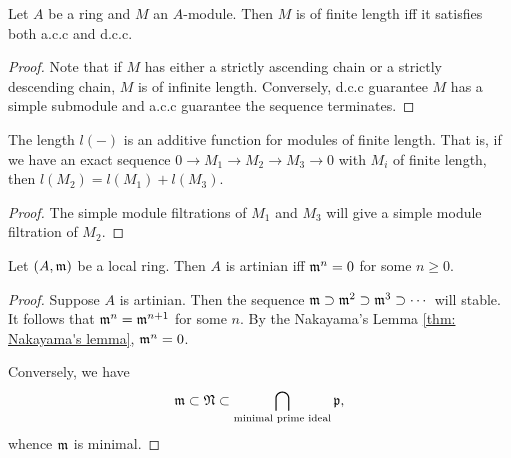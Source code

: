     \begin{proposition}\label{prop: of finite length iff both acc and dcc}
        Let $A$ be a ring and $M$ an $A$-module.
        Then $M$ is of finite length iff it satisfies both a.c.c and d.c.c.
    \end{proposition}
    \begin{proof}
        Note that if $M$ has either a strictly ascending chain or a strictly descending chain, $M$ is of infinite length.
        Conversely, d.c.c guarantee $M$ has a simple submodule and a.c.c guarantee the sequence terminates.
    \end{proof}

    \begin{proposition}\label{prop: length is additive for modules of finite length}
        The length $l(-)$ is an additive function for modules of finite length.
        That is, if we have an exact sequence $0 \to M_1 \to M_2 \to M_3 \to 0$ with $M_i$ of finite length, then $l(M_2) = l(M_1) + l(M_3)$.
    \end{proposition}
    \begin{proof}
        The simple module filtrations of $M_1$ and $M_3$ will give a simple module filtration of $M_2$.
    \end{proof}

    \begin{proposition}\label{prop: characteristic of local artinian rings}
        Let $(A,{\mathfrak{m}})$ be a local ring.
        Then $A$ is artinian iff ${\mathfrak{m}}^n = 0$ for some $n\geq 0$.    
    \end{proposition}
    \begin{proof}
        Suppose $A$ is artinian.
        Then the sequence ${\mathfrak{m}} \supset {\mathfrak{m}}^2 \supset {\mathfrak{m}}^3 \supset \cdots$ will stable.
        It follows that ${\mathfrak{m}}^n = {\mathfrak{m}}^{n+1}$ for some $n$.
        By the Nakayama's Lemma \ref{thm: Nakayama's lemma}, ${\mathfrak{m}}^n = 0$.

        Conversely, we have 
        \[ {\mathfrak{m}} \subset {\mathfrak{N}} \subset \bigcap_{\text{minimal prime ideal}} {\mathfrak{p}},\] 
        whence ${\mathfrak{m}}$ is minimal.
    \end{proof}

